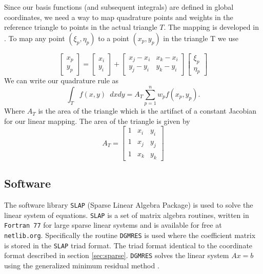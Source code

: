 \documentclass[wrr]{agutex}  %
\begin{document}
\begin{article}
Since our basis functions (and subsequent integrals) are defined in global coordinates, we need a way to map quadrature points and weights in the reference triangle to points in the actual triangle $T$.  The mapping is developed in \cite{Burkardt2005b}.  To map any point $(\xi_p,\eta_p)$ to a point $(x_p,y_p)$ in the triangle T we use 

\begin{equation}
  \left[\begin{array}{c} x_p \\ y_p \end{array} \right] = 
  \left[\begin{array}{c} x_i \\ y_i \end{array}\right] +
  \left[\begin{array}{cc} x_j-x_i & x_k-x_i \\ y_j-y_i & y_k-y_i\end{array}\right]
  \left[\begin{array}{c} \xi_p \\ \eta_p \end{array}\right]
\end{equation}
We can write our quadrature rule as 
\begin{equation}
  \int_{T}f(x,y)\,\,\,dxdy=A_T\sum_{p=1}^{n}w_pf(x_p,y_p).
\end{equation}
Where $A_T$ is the area of the triangle which is the artifact of a constant Jacobian for our linear mapping.  The area of the triangle is given by 
\begin{equation}
A_T=\left[\begin{array}{ccc}1 & x_i & y_i \\1 & x_j & y_j \\1 & x_k & y_k\end{array}\right]
\end{equation}


\subsection{Software}
The software library {\tt SLAP} (Sparse Linear Algebra Package) \citep{Seager1988} is used to solve the linear system of equations.  {\tt SLAP} is a set of matrix algebra routines, written in {\tt Fortran 77} for large sparse linear systems and is available for free at {\tt netlib.org}. Specifically the routine {\tt DGMRES} is used where the coefficient matrix is stored in the {\tt SLAP} triad format.  The triad format identical to the coordinate format described in section \ref{sec:sparse}.  {\tt DGMRES} solves the linear system $Ax=b$ using the generalized minimum residual method \citep{Seager1988}.  


\end{article}
\end{document}
